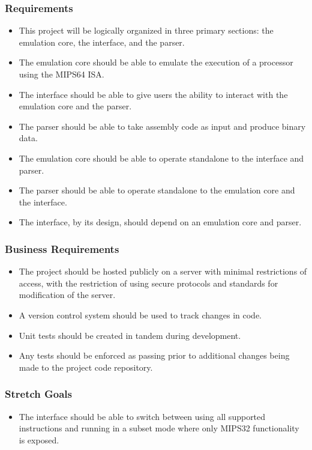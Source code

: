 \documentclass[
    paper=letter,
    parskip=half,
    fontsize=12pt,
    titlepage=firstiscover,
    toc=bibliography,
    numbers=endperiod
]{scrartcl}
\begin{document}
\subsubsection{Requirements}
\begin{itemize}
    \item This project will be logically organized in three primary sections: the
          emulation core, the interface, and the parser.
    \item The emulation core should be able to emulate the execution of a
          processor using the MIPS64 ISA.
    \item The interface should be able to give users the ability to interact with
          the emulation core and the parser.
    \item The parser should be able to take assembly code as input and produce
          binary data.
    \item The emulation core should be able to operate standalone to the interface
          and parser.
    \item The parser should be able to operate standalone to the emulation core
          and the interface.
    \item The interface, by its design, should depend on an emulation core and
          parser.
\end{itemize}

\subsubsection{Business Requirements}
\begin{itemize}
    \item The project should be hosted publicly on a server with minimal
          restrictions of access, with the restriction of using secure protocols
          and standards for modification of the server.
    \item A version control system should be used to track changes in code.
    \item Unit tests should be created in tandem during development.
    \item Any tests should be enforced as passing prior to additional changes
          being made to the project code repository.
\end{itemize}

\subsubsection{Stretch Goals}
\begin{itemize}
    \item The interface should be able to switch between using all supported
          instructions and running in a subset mode where only MIPS32
          functionality is exposed.
\end{itemize}
\end{document}
